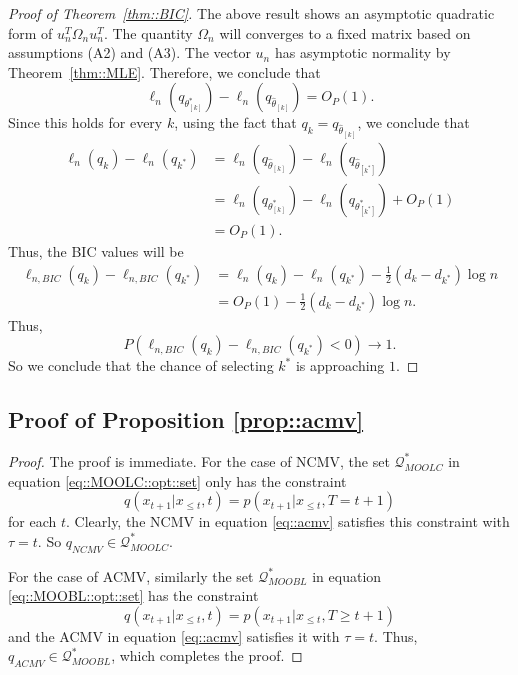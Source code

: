 \documentclass[aos, preprint]{imsart}
\theoremstyle{plain}
\theoremstyle{definition}
\let\hat\widehat
\begin{document}
\begin{appendix}
\begin{proof}[Proof of Theorem~\ref{thm::BIC}]
The above result shows an asymptotic quadratic form of $u_n^T \Omega_n u_n^T$.
The quantity $\Omega_n$ will converges to a fixed matrix based on assumptions (A2) and (A3). 
The vector $u_n$ has asymptotic normality by Theorem~\ref{thm::MLE}. 
Therefore, we conclude that 
$$
\ell_n(q_{ \theta^*_{[k]}}) - \ell_n(q_{\hat \theta_{[k]}}) = O_P(1).
$$
Since this holds for every $k$, using the fact that $q_k = q_{\hat \theta_{[k]}}$, we conclude that 
\begin{align*}
\ell_n(q_k) - \ell_n(q_{k^*})  & =  \ell_n(q_{\hat \theta_{[k]}})  - \ell_n(q_{\hat \theta_{[k^*]}}) \\
& = \ell_n(q_{ \theta^*_{[k]}}) - \ell_n(q_{ \theta^*_{[k^*]}}) +O_P(1)\\
& = O_P(1).
\end{align*}
Thus, the BIC values will be 
\begin{align*}
\ell_{n,BIC}(q_k) - \ell_{n, BIC}(q_{k^*}) & = \ell_n(q_k) - \ell_n(q_{k^*}) -\frac{1}{2}(d_k-d_{k^*})\log n\\
& =  O_P(1) -\frac{1}{2}(d_k-d_{k^*})\log n.
\end{align*}
Thus, 
$$
P(\ell_{n,BIC}(q_k) - \ell_{n, BIC}(q_{k^*})<0)\rightarrow 1. 
$$
So we conclude that the chance of selecting $k^*$ is approaching $1$.



\end{proof}



\subsection{Proof of Proposition \ref{prop::acmv}}
\begin{proof}

The proof is immediate.
For the case of NCMV, 
the set $\mathcal{Q}^*_{MOOLC}$ in equation \eqref{eq::MOOLC::opt::set}
only has the constraint
$$
q(x_{t+1}|x_{\leq t}, t) = p(x_{t+1}|x_{\leq t},T=t+1) 
$$
for each $t$.
Clearly, the NCMV in equation \eqref{eq::acmv} satisfies this constraint with $\tau=t$. 
So $q_{NCMV} \in \mathcal{Q}^*_{MOOLC}$. 

For the case of ACMV, similarly the set $\mathcal{Q}^*_{MOOBL}$ in equation \eqref{eq::MOOBL::opt::set}
has the constraint 
$$
q(x_{t+1}|x_{\leq t}, t) = p(x_{t+1}|x_{\leq t},T\geq t+1)
$$
and the ACMV in equation \eqref{eq::acmv} satisfies it with $\tau = t$.
Thus, $q_{ACMV}\in \mathcal{Q}^*_{MOOBL}$,
which completes the proof.

\end{proof}



\end{appendix}
\end{document}

